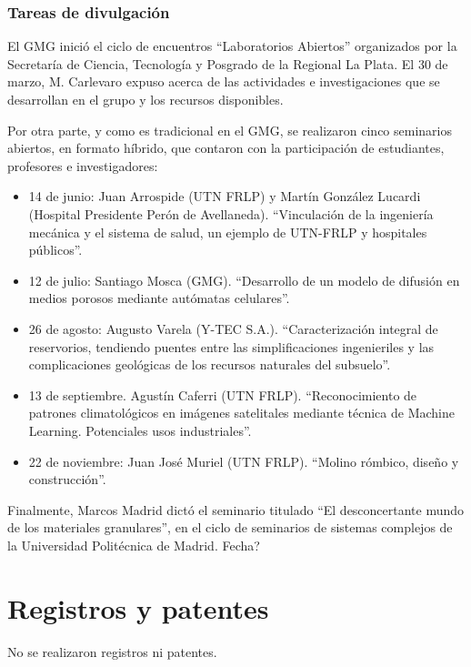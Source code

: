 \documentclass[a4paper,11pt,twoside,final,titlepage,onecolumn,openright]{report}
\begin{document}
\subsubsection{Tareas de divulgación}

El GMG inició el ciclo de encuentros ``Laboratorios Abiertos'' organizados por la Secretaría de Ciencia, Tecnología y Posgrado de la Regional La Plata. El 30 de marzo, M. Carlevaro expuso acerca de las actividades e investigaciones que se desarrollan en el grupo y los recursos disponibles.

Por otra parte, y como es tradicional en el GMG, se realizaron cinco seminarios abiertos, en formato híbrido, que contaron con la participación de estudiantes, profesores e investigadores:
\begin{itemize}
    \item 14 de junio: Juan Arrospide (UTN FRLP) y Martín González Lucardi (Hospital Presidente Perón de Avellaneda). ``Vinculación de la ingeniería mecánica y el sistema de salud, un ejemplo de UTN-FRLP y hospitales públicos''.
    \item 12 de julio: Santiago Mosca (GMG). ``Desarrollo de un modelo de difusión en medios porosos mediante autómatas celulares''.
    \item 26 de agosto: Augusto Varela (Y-TEC S.A.). ``Caracterización integral de reservorios, tendiendo puentes entre las simplificaciones ingenieriles y las complicaciones geológicas de los recursos naturales del subsuelo''.
    \item 13 de septiembre. Agustín Caferri (UTN FRLP). ``Reconocimiento de patrones climatológicos en imágenes satelitales mediante técnica de Machine Learning. Potenciales usos industriales''.
    \item 22 de noviembre: Juan José Muriel (UTN FRLP). ``Molino rómbico, diseño y construcción''.
\end{itemize}

Finalmente, Marcos Madrid dictó el seminario titulado ``El desconcertante mundo de los materiales granulares'', en el ciclo de seminarios de sistemas complejos de la Universidad Politécnica de Madrid. {\color{red}Fecha?}

\section{Registros y patentes}

No se realizaron registros ni patentes.
\end{document}
